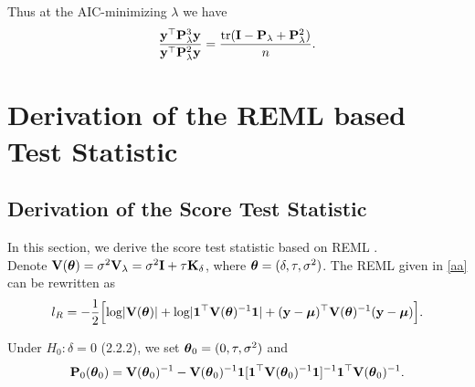 \documentclass[article]{jss}
\begin{document}
\begin{appendix}
Thus at the AIC-minimizing $\lambda$ we have
\begin{align*}
\frac{{\bf y}^\top  {\bf P}_\lambda^3{\bf y}}{{\bf y}^\top  {\bf P}_\lambda^2{\bf y}}=\frac{\mbox{tr}({\bf I}-{\bf P}_\lambda+{\bf P}_\lambda^2)}{n}.
\end{align*}


\section{Derivation of the REML based Test Statistic}
\subsection{Derivation of the Score Test Statistic}

In this section, we derive the score test statistic based on REML \citep{maity_powerful_2011}.\\ 
Denote ${\bf V}(\boldsymbol{\theta})=\sigma^2 {\bf V}_\lambda=\sigma^2{\bf I}+\tau {\bf K}_\delta$, where $\boldsymbol{\theta}=(\delta, \tau, \sigma^2)$. The REML given in \eqref{aa} can be rewritten as
\begin{align}
l_R=-\frac{1}{2}\Big[\mbox{log}| {\bf V}(\boldsymbol{\theta}) | +\mbox{log} | \mathbf{1}^\top {\bf V}(\boldsymbol{\theta})^{-1}\mathbf{1} | +({\bf y}-\boldsymbol{\mu})^\top {\bf V}(\boldsymbol{\theta})^{-1}({\bf y}-\boldsymbol{\mu})\Big]. \label{pp}
\end{align}

Under $H_0: \delta=0$ (2.2.2), we set $\boldsymbol{\theta}_0=(0, \tau, \sigma^2)$ and
\begin{align*}
{\bf P}_0(\boldsymbol{\theta}_0)={\bf V}(\boldsymbol{\theta}_0)^{-1}-{\bf V}(\boldsymbol{\theta}_0)^{-1}\mathbf{1}[\mathbf{1}^\top {\bf V}(\boldsymbol{\theta}_0)^{-1}\mathbf{1}]^{-1}\mathbf{1}^\top {\bf V}(\boldsymbol{\theta}_0)^{-1}.
\end{align*}


\end{appendix}
\end{document}
